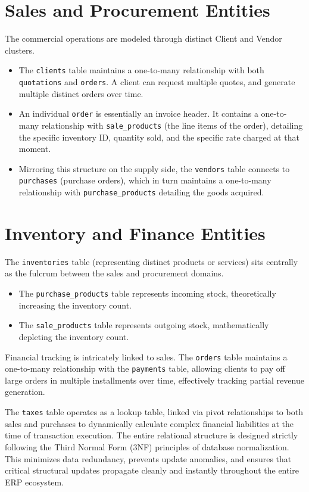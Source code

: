 ﻿\documentclass[12pt,a4paper]{report}
\begin{document}
\section*{Sales and Procurement Entities}
The commercial operations are modeled through distinct Client and Vendor clusters.
\begin{itemize}
    \item The \texttt{clients} table maintains a one-to-many relationship with both \texttt{quotations} and \texttt{orders}. A client can request multiple quotes, and generate multiple distinct orders over time.
    \item An individual \texttt{order} is essentially an invoice header. It contains a one-to-many relationship with \texttt{sale\_products} (the line items of the order), detailing the specific inventory ID, quantity sold, and the specific rate charged at that moment.
    \item Mirroring this structure on the supply side, the \texttt{vendors} table connects to \texttt{purchases} (purchase orders), which in turn maintains a one-to-many relationship with \texttt{purchase\_products} detailing the goods acquired.
\end{itemize}

\section*{Inventory and Finance Entities}
The \texttt{inventories} table (representing distinct products or services) sits centrally as the fulcrum between the sales and procurement domains. 
\begin{itemize}
    \item The \texttt{purchase\_products} table represents incoming stock, theoretically increasing the inventory count.
    \item The \texttt{sale\_products} table represents outgoing stock, mathematically depleting the inventory count.
\end{itemize}
Financial tracking is intricately linked to sales. The \texttt{orders} table maintains a one-to-many relationship with the \texttt{payments} table, allowing clients to pay off large orders in multiple installments over time, effectively tracking partial revenue generation. 

The \texttt{taxes} table operates as a lookup table, linked via pivot relationships to both sales and purchases to dynamically calculate complex financial liabilities at the time of transaction execution. The entire relational structure is designed strictly following the Third Normal Form (3NF) principles of database normalization. This minimizes data redundancy, prevents update anomalies, and ensures that critical structural updates propagate cleanly and instantly throughout the entire ERP ecosystem.
\end{document}
